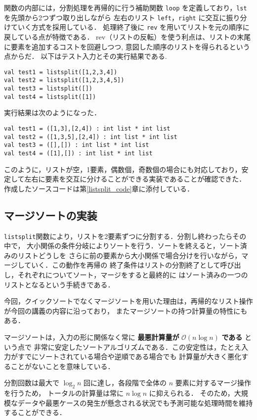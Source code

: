 \documentclass[autodetect-engine,dvi=dvipdfmx,ja=standard,
               a4j,11pt]{bxjsarticle}
\begin{document}
関数の内部には，分割処理を再帰的に行う補助関数 \verb|loop| を定義しており，\verb|lst| を先頭から2つずつ取り出しながら
左右のリスト \verb|left|，\verb|right| に交互に振り分けていく方式を採用している．
処理終了後に \verb|rev| を用いてリストを元の順序に戻している点が特徴である．
rev（リストの反転）を使う利点は、リストの末尾に要素を追加するコストを回避しつつ,
意図した順序のリストを得られるという点からだ．
以下はテスト入力とその実行結果である.
\begin{Verbatim}
val test1 = listsplit([1,2,3,4])
val test2 = listsplit([1,2,3,4,5])
val test3 = listsplit([])
val test4 = listsplit([1])
\end{Verbatim}
実行結果は次のようになった．
\begin{Verbatim}
val test1 = ([1,3],[2,4]) : int list * int list
val test2 = ([1,3,5],[2,4]) : int list * int list
val test3 = ([],[]) : int list * int list
val test4 = ([1],[]) : int list * int list
\end{Verbatim}
このように，リストが空，1要素，偶数個，奇数個の場合にも対応しており，安定して左右に要素を交互に分けることができる実装であることが確認できた．
作成したソースコードは第\ref{listsplit_code}章に添付している．
\subsection{マージソートの実装}\label{mergesort}
\verb|listsplit|関数により，リストを2要素ずつに分割する．分割し終わったらその中で，
大小関係の条件分岐によりソートを行う．ソートを終えると，ソート済みのリストどうしを
さらに前の要素から大小関係で場合分けを行いながら，マージしていく．この動作を再帰の
終了条件はリストの分割終了として呼び出し，それぞれについてソート，マージをすると最終的に
はソート済みの一つのリストとなるという手続きである．

今回，クイックソートでなくマージソートを用いた理由は，再帰的なリスト操作が今回の講義の内容に沿っており，
またマージソートの持つ計算量の特性にもある．

マージソートは，入力の形に関係なく常に \textbf{最悪計算量が} $\mathcal{O}(n \log n)$ \textbf{である} という点で
非常に安定したソートアルゴリズムである．この安定性は，たとえ入力がすでにソートされている場合や逆順である場合でも
計算量が大きく悪化することがないことを意味している．

分割回数は最大で $\log_2 n$ 回に達し，各段階で全体の $n$ 要素に対するマージ操作を行うため，
トータルの計算量は常に $n \log n$ に抑えられる．
そのため，大規模なデータや最悪ケースの発生が懸念される状況でも予測可能な処理時間を維持することができる．
\end{document}

